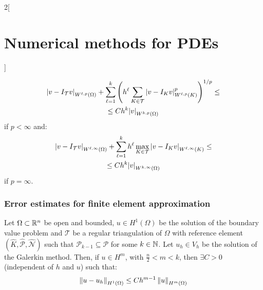 \documentclass[../../../main_math.tex]{subfiles}
\begin{document}
\begin{multicols}{2}[\section{Numerical methods for PDEs}]
\begin{theorem}
    \begin{multline*}
      \abs{v-I_\mathcal{T}v}_{W^{\ell,p}(\Omega)}+\sum_{\ell=1}^k\left(h^\ell\sum_{K\in\mathcal{T}} \abs{v-I_Kv}_{W^{\ell,p}(K)}^p\right)^{1/p}\leq \\\leq C h^k\abs{v}_{W^{k,p}(\Omega)}
    \end{multline*}
    if $p<\infty$ and:
    \begin{multline*}
      \abs{v-I_\mathcal{T}v}_{W^{\ell,\infty}(\Omega)}+\sum_{\ell=1}^kh^\ell \max_{K\in\mathcal{T}}\abs{v-I_Kv}_{W^{\ell,\infty}(K)}\leq\\\leq C h^k\abs{v}_{W^{k,\infty}(\Omega)}
    \end{multline*}
    if $p=\infty$.
  \end{theorem}
  \subsubsection{Error estimates for finite element approximation}
  \begin{theorem}
    Let $\Omega\subset\mathbb{R}^n$ be open and bounded, $u\in H^1(\Omega)$ be the solution of the boundary value problem and $\mathcal{T}$ be a regular triangulation of $\Omega$ with reference element $(\widehat{K}, \widehat{\mathcal{P}}, \widehat{\mathcal{N}})$ such that $\mathcal{P}_{k-1}\subseteq \mathcal{P}$ for some $k\in\mathbb{N}$. Let $u_h\in V_h$ be the solution of the Galerkin method. Then, if $u\in H^m$, with $\frac{n}{2}< m<k$, then $\exists C>0$ (independent of $h$ and $u$) such that:
    $$
      \left\|u-u_h\right\|_{H^1(\Omega)}\leq C h^{m-1}\left\|u\right\|_{H^m(\Omega)}
    $$
  \end{theorem}

\end{multicols}
\end{document}
